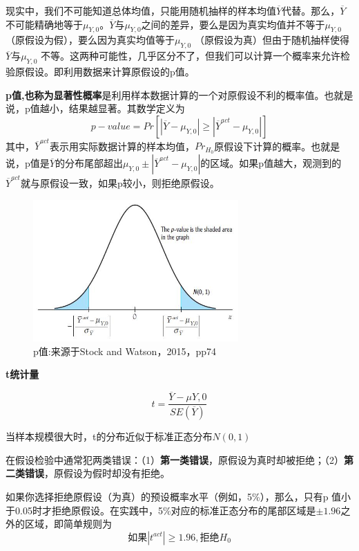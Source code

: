 \documentclass[cn,10pt,math=newtx,citestyle=gb7714-2015,bibstyle=gb7714-2015]{elegantbook}
\begin{document}
	现实中，我们不可能知道总体均值，只能用随机抽样的样本均值$\overline{Y}$代替。那么，$\overline{Y}$不可能精确地等于$\mu_{Y,0}$。$\overline{Y}$与$\mu_{Y,0}$之间的差异，要么是因为真实均值并不等于$\mu_{Y,0}$（原假设为假），要么因为真实均值等于$\mu_{Y,0}$ （原假设为真）但由于随机抽样使得$\overline{Y}$与$\mu_{Y,0}$ 不等。这两种可能性，几乎区分不了，但我们可以计算一个概率来允许检验原假设。即利用数据来计算原假设的p值。
	
	\textbf{p值,也称为显著性概率}是利用样本数据计算的一个对原假设不利的概率值。也就是说，p值越小，结果越显著。其数学定义为
	\begin{equation}
		p-value=Pr[|\overline{Y}-\mu_{Y,0}|\geq|\overline{Y}^{act}-\mu_{Y,0}|]
	\end{equation}
	其中，$\overline{Y}^{act}$表示用实际数据计算的样本均值，$Pr_{H_0}$原假设下计算的概率。也就是说，p值是$\overline{Y}$的分布尾部超出$\mu_{Y,0}\pm|\overline{Y}^{act}-\mu_{Y,0}|$的区域。如果p值越大，观测到的$\overline{Y}^{act}$就与原假设一致，如果p较小，则拒绝原假设。
	\begin{figure}[htbp]
		\centering
		\includegraphics[width=0.7\textwidth]{p.jpg}
		\caption{p值:来源于Stock and Watson，2015，pp74}\label{fig:digit}
	\end{figure}
	
	\textbf{t统计量}
	
	\begin{equation}
		t=\frac{\overline{Y}-\mu{Y,0}}{SE(\overline{Y})}
	\end{equation}
	
	当样本规模很大时，t的分布近似于标准正态分布$N(0,1)$
	
	在假设检验中通常犯两类错误：（1）\textbf{第一类错误}，原假设为真时却被拒绝；（2）\textbf{第二类错误}，原假设为假时却没有拒绝。
	
	如果你选择拒绝原假设（为真）的预设概率水平（例如，5\%），那么，只有p 值小于0.05时才拒绝原假设。在实践中，5\%对应的标准正态分布的尾部区域是$\pm1.96$之外的区域，即简单规则为
	\begin{equation}
		如果|t^{act}|\geq1.96,拒绝H_0
	\end{equation}
	
\end{document}
